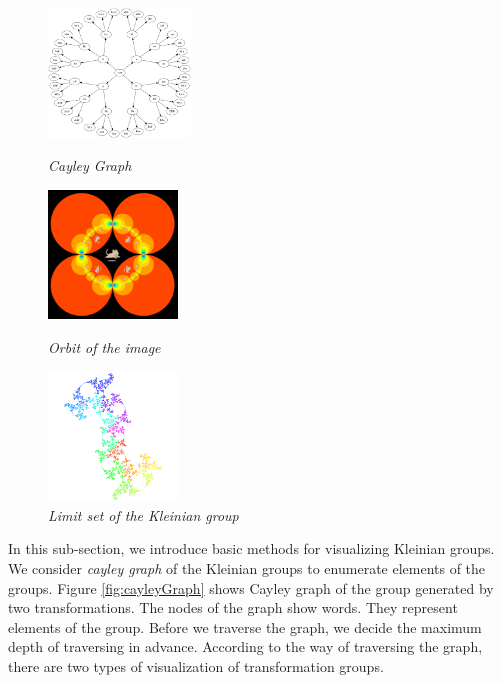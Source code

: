 \begin{figure}[htbp]
 \begin{minipage}[t]{0.333\hsize}
  \center
  \includegraphics[height=1.35in, keepaspectratio]{img/cayleyGraph.png}
  \caption{\textit{Cayley Graph}}
  \label{fig:cayleyGraph}
  \hspace*{\fill}
 \end{minipage}
 \begin{minipage}[t]{0.333\hsize}
  \center
  \includegraphics[height=1.35in, keepaspectratio]{img/preparation/basic/catOrbit.png}
  \caption{\textit{Orbit of the image}}
  \label{fig:orbitCat}
  \hspace*{\fill}
 \end{minipage}
 \begin{minipage}[t]{0.333\hsize}
  \center
  \includegraphics[height=1.35in, keepaspectratio]{img/preparation/limitSet/limit.png}
  \caption{\textit{Limit set of the Kleinian group}}
  \label{fig:limit}
  \hspace*{\fill}
 \end{minipage}
\end{figure}

\noindent In this sub-section, we introduce basic methods for visualizing Kleinian groups.
We consider \textit{cayley graph} of the Kleinian groups to enumerate elements
of the groups.
Figure \ref{fig:cayleyGraph} shows Cayley graph of the group generated
by two transformations.
The nodes of the graph show words.
They represent elements of the group.
Before we traverse the graph, we decide the maximum depth of traversing in advance.
According to the way of traversing the graph, 
there are two types of visualization of transformation groups.

